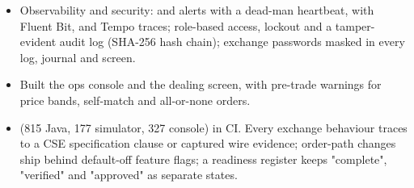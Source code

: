 \begin{itemize}[leftmargin=*, itemsep=0.3em, topsep=0.01em]
  \item Observability and security:  and  alerts with a dead-man heartbeat,  with Fluent Bit, and Tempo traces; role-based access, lockout and a tamper-evident audit log (SHA-256 hash chain); exchange passwords masked in every log, journal and screen.
  \item Built the ops console and the  dealing screen, with pre-trade warnings for price bands, self-match and all-or-none orders.
  \item {} (815 Java, 177 simulator, 327 console) in CI. Every exchange behaviour traces to a CSE specification clause or captured wire evidence; order-path changes ship behind default-off feature flags; a readiness register keeps "complete", "verified" and "approved" as separate states.
\end{itemize}
